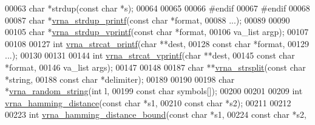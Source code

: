 \begin{DoxyCode}
00063 \textcolor{keywordtype}{char} *strdup(\textcolor{keyword}{const} \textcolor{keywordtype}{char} *s);
00064 
00065 
00066 \textcolor{preprocessor}{#endif}
00067 \textcolor{preprocessor}{#endif}
00068 
00087 \textcolor{keywordtype}{char} *\mbox{\hyperlink{group__string__utils_ga33cc0190a326ec368277caa777b8bf18}{vrna\_strdup\_printf}}(\textcolor{keyword}{const} \textcolor{keywordtype}{char} *format,
00088                          ...);
00089 
00090 
00105 \textcolor{keywordtype}{char} *\mbox{\hyperlink{group__string__utils_ga459fdee190ed81bb7773cbaf671748a9}{vrna\_strdup\_vprintf}}(\textcolor{keyword}{const} \textcolor{keywordtype}{char}  *format,
00106                           va\_list     argp);
00107 
00108 
00127 \textcolor{keywordtype}{int} \mbox{\hyperlink{group__string__utils_gac0771ec71316023067f2aae61a5aa0fb}{vrna\_strcat\_printf}}(\textcolor{keywordtype}{char}       **dest,
00128                        \textcolor{keyword}{const} \textcolor{keywordtype}{char} *format,
00129                        ...);
00130 
00131 
00144 \textcolor{keywordtype}{int} \mbox{\hyperlink{group__string__utils_ga122df216996ba62fd5056b7743e3131a}{vrna\_strcat\_vprintf}}(\textcolor{keywordtype}{char}        **dest,
00145                         \textcolor{keyword}{const} \textcolor{keywordtype}{char}  *format,
00146                         va\_list     args);
00147 
00148 
00187 \textcolor{keywordtype}{char} **\mbox{\hyperlink{group__string__utils_gac632775617f4b2df096bfe8efb53d07f}{vrna\_strsplit}}(\textcolor{keyword}{const} \textcolor{keywordtype}{char} *\textcolor{keywordtype}{string},
00188                      \textcolor{keyword}{const} \textcolor{keywordtype}{char} *delimiter);
00189 
00190 
00198 \textcolor{keywordtype}{char} *\mbox{\hyperlink{group__string__utils_ga4eeb3750dcf860b9f3158249f95dbd7f}{vrna\_random\_string}}(\textcolor{keywordtype}{int}        l,
00199                          \textcolor{keyword}{const} \textcolor{keywordtype}{char} symbols[]);
00200 
00201 
00209 \textcolor{keywordtype}{int} \mbox{\hyperlink{group__string__utils_ga301798b43b6f66687985c725efd14f32}{vrna\_hamming\_distance}}(\textcolor{keyword}{const} \textcolor{keywordtype}{char}  *s1,
00210                           \textcolor{keyword}{const} \textcolor{keywordtype}{char}  *s2);
00211 
00212 
00223 \textcolor{keywordtype}{int} \mbox{\hyperlink{group__string__utils_ga5d1c2271e79d9bcb52d4e68360763fb9}{vrna\_hamming\_distance\_bound}}(\textcolor{keyword}{const} \textcolor{keywordtype}{char}  *s1,
00224                                 \textcolor{keyword}{const} \textcolor{keywordtype}{char}  *s2,

\end{DoxyCode}
